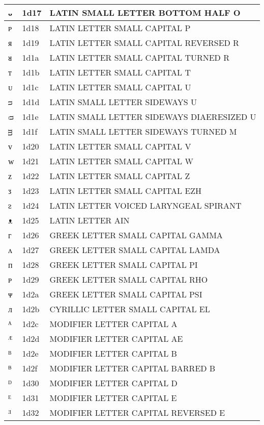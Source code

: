 \documentclass[12pt,letterpaper,openany]{book}
\begin{document}
\begin{center}
\begin{supertabular}{|m{0.25in}|m{0.5in}|m{4in}|}
			ᴗ & 1d17 & LATIN SMALL LETTER BOTTOM HALF O\\\hline
			ᴘ & 1d18 & LATIN LETTER SMALL CAPITAL P\\\hline
			ᴙ & 1d19 & LATIN LETTER SMALL CAPITAL REVERSED R\\\hline
			ᴚ & 1d1a & LATIN LETTER SMALL CAPITAL TURNED R\\\hline
			ᴛ & 1d1b & LATIN LETTER SMALL CAPITAL T\\\hline
			ᴜ & 1d1c & LATIN LETTER SMALL CAPITAL U\\\hline
			ᴝ & 1d1d & LATIN SMALL LETTER SIDEWAYS U\\\hline
			ᴞ & 1d1e & LATIN SMALL LETTER SIDEWAYS DIAERESIZED U\\\hline
			ᴟ & 1d1f & LATIN SMALL LETTER SIDEWAYS TURNED M\\\hline
			ᴠ & 1d20 & LATIN LETTER SMALL CAPITAL V\\\hline
			ᴡ & 1d21 & LATIN LETTER SMALL CAPITAL W\\\hline
			ᴢ & 1d22 & LATIN LETTER SMALL CAPITAL Z\\\hline
			ᴣ & 1d23 & LATIN LETTER SMALL CAPITAL EZH\\\hline
			ᴤ & 1d24 & LATIN LETTER VOICED LARYNGEAL SPIRANT\\\hline
			ᴥ & 1d25 & LATIN LETTER AIN\\\hline
			ᴦ & 1d26 & GREEK LETTER SMALL CAPITAL GAMMA\\\hline
			ᴧ & 1d27 & GREEK LETTER SMALL CAPITAL LAMDA\\\hline
			ᴨ & 1d28 & GREEK LETTER SMALL CAPITAL PI\\\hline
			ᴩ & 1d29 & GREEK LETTER SMALL CAPITAL RHO\\\hline
			ᴪ & 1d2a & GREEK LETTER SMALL CAPITAL PSI\\\hline
			ᴫ & 1d2b & CYRILLIC LETTER SMALL CAPITAL EL\\\hline
			ᴬ & 1d2c & MODIFIER LETTER CAPITAL A\\\hline
			ᴭ & 1d2d & MODIFIER LETTER CAPITAL AE\\\hline
			ᴮ & 1d2e & MODIFIER LETTER CAPITAL B\\\hline
			ᴯ & 1d2f & MODIFIER LETTER CAPITAL BARRED B\\\hline
			ᴰ & 1d30 & MODIFIER LETTER CAPITAL D\\\hline
			ᴱ & 1d31 & MODIFIER LETTER CAPITAL E\\\hline
			ᴲ & 1d32 & MODIFIER LETTER CAPITAL REVERSED E\\\hline

\end{supertabular}
\end{center}
\end{document}
